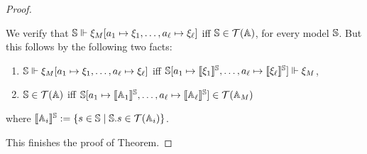 \begin{proof}
\begin{pfclaim}
 We verify that $\mathbb{S} \Vdash \xi_{M}[a_1\mapsto\xi_{1}, \dots, a_\ell\mapsto\xi_{\ell}]$ iff $\mathbb{S} \in \mathcal{T}(\mathbb{A})$, for every model $\mathbb{S}$.
But this follows by the following two facts:
\begin{enumerate}
\item $\mathbb{S}\Vdash \xi_{M}[a_1\mapsto\xi_{1}, \dots, a_\ell\mapsto\xi_{\ell}]$ iff $\mathbb{S}[a_1\mapsto \llbracket\xi_1\rrbracket^{\mathbb{S}}, \dots, a_\ell\mapsto \llbracket\xi_\ell\rrbracket^{\mathbb{S}}  ] \Vdash \xi_M$,
\item $\mathbb{S} \in \mathcal{T}(\mathbb{A})$  iff $\mathbb{S}[a_1\mapsto \llbracket\mathbb{A}_1\rrbracket^{\mathbb{S}}, \dots, a_\ell\mapsto \llbracket\mathbb{A}_\ell\rrbracket^{\mathbb{S}}  ] \in \mathcal{T}(\mathbb{A}_M)$
\end{enumerate}
where %
$\llbracket\mathbb{A}_i\rrbracket^{\mathbb{S}} := \{ s \in \mathbb{S} \mid \mathbb{S}.s \in \mathcal{T}(\mathbb{A}_i) \}$. 
\end{pfclaim}
This finishes the proof of Theorem. 
\end{proof}
